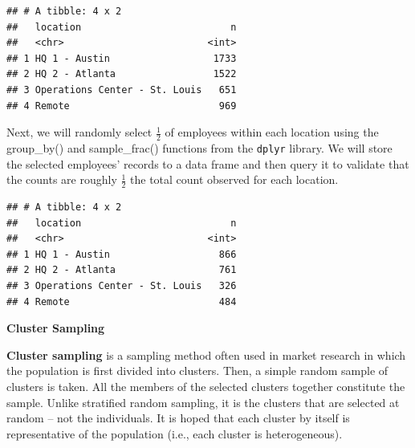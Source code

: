\documentclass[]{book}
\newenvironment{Shaded}{\begin{snugshade}}{\end{snugshade}}
\newcommand{\CommentTok}[1]{\textcolor[rgb]{0.56,0.35,0.01}{\textit{#1}}}
\newcommand{\DataTypeTok}[1]{\textcolor[rgb]{0.13,0.29,0.53}{#1}}
\newcommand{\FloatTok}[1]{\textcolor[rgb]{0.00,0.00,0.81}{#1}}
\newcommand{\KeywordTok}[1]{\textcolor[rgb]{0.13,0.29,0.53}{\textbf{#1}}}
\newcommand{\NormalTok}[1]{#1}
\newcommand{\OperatorTok}[1]{\textcolor[rgb]{0.81,0.36,0.00}{\textbf{#1}}}
\newcommand{\StringTok}[1]{\textcolor[rgb]{0.31,0.60,0.02}{#1}}
\begin{document}
\begin{verbatim}
## # A tibble: 4 x 2
##   location                          n
##   <chr>                         <int>
## 1 HQ 1 - Austin                  1733
## 2 HQ 2 - Atlanta                 1522
## 3 Operations Center - St. Louis   651
## 4 Remote                          969
\end{verbatim}

Next, we will randomly select \(\frac{1}{2}\) of employees within each location using the group\_by() and sample\_frac() functions from the \texttt{dplyr} library. We will store the selected employees' records to a data frame and then query it to validate that the counts are roughly \(\frac{1}{2}\) the total count observed for each location.

\begin{Shaded}
\end{Shaded}

\begin{verbatim}
## # A tibble: 4 x 2
##   location                          n
##   <chr>                         <int>
## 1 HQ 1 - Austin                   866
## 2 HQ 2 - Atlanta                  761
## 3 Operations Center - St. Louis   326
## 4 Remote                          484
\end{verbatim}

\textbf{Cluster Sampling}

\textbf{Cluster sampling} is a sampling method often used in market research in which the population is first divided into clusters. Then, a simple random sample of clusters is taken. All the members of the selected clusters together constitute the sample. Unlike stratified random sampling, it is the clusters that are selected at random -- not the individuals. It is hoped that each cluster by itself is representative of the population (i.e., each cluster is heterogeneous).
\end{document}
